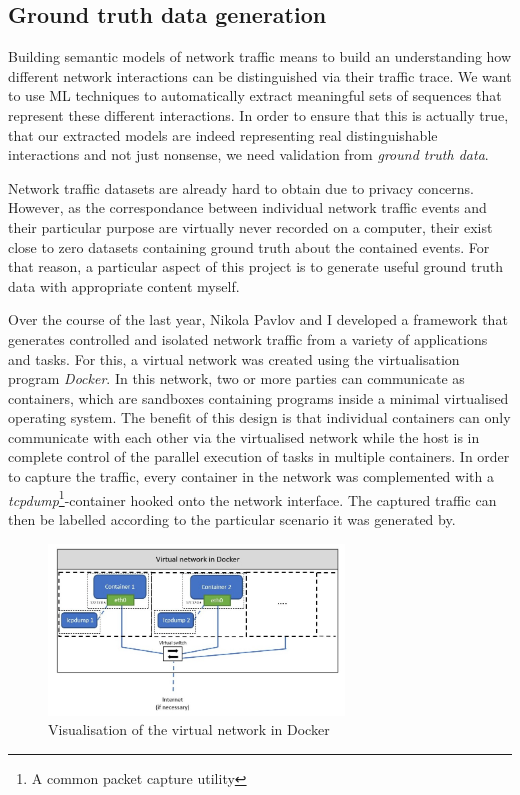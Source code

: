 \documentclass[a4paper,12pt,twoside]{report}
\begin{document}
\subsection{Ground truth data generation}\label{Groundtruth}

Building semantic models of network traffic means to build an understanding how different network interactions can be distinguished via their traffic trace. We want to use ML techniques to automatically extract meaningful sets of sequences that represent these different interactions. In order to ensure that this is actually true, that our extracted models are indeed representing real distinguishable interactions and not just nonsense, we need validation from \textit{ground truth data}. 

Network traffic datasets are already hard to obtain due to privacy concerns. However, as  the correspondance between individual network traffic events and their particular purpose are virtually never recorded on a computer, their exist close to zero datasets containing ground truth about the contained events. For that reason, a particular aspect of this project is to generate useful ground truth data with appropriate content myself.

Over the course of the last year, Nikola Pavlov and I developed a framework that generates controlled and isolated network traffic from a variety of applications and tasks. For this, a virtual network was created using the virtualisation program \textit{Docker}. In this network, two or more parties can communicate as containers,  which are sandboxes containing programs inside a minimal virtualised operating system. The benefit of this design is that individual containers can only communicate with each other via the virtualised network while the host is in complete control of the parallel execution of tasks in multiple containers. In order to capture the traffic, every container in the network was complemented with a \textit{tcpdump}\footnote{A common packet capture utility}-container hooked onto the network interface. The captured traffic can then be labelled according to the particular scenario it was generated by.


\begin{figure}
\centering
\includegraphics[width=0.7\textwidth]{images/Dockernet.jpg}
\caption{Visualisation of the virtual network in Docker}\label{docker}
\end{figure}
\end{document}

